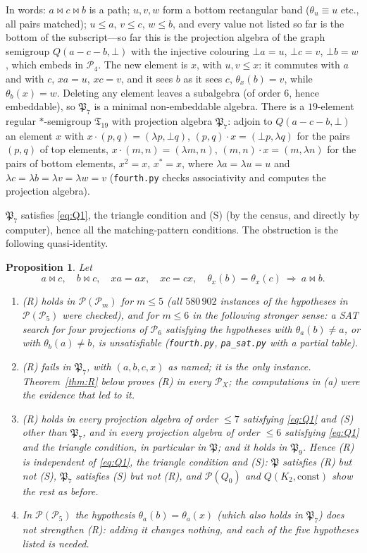 \documentclass[11pt]{amsart}
\newtheorem{proposition}[theorem]{Proposition}
\theoremstyle{definition}
\renewcommand{\P}{\mathcal{P}}
\begin{document}
In words: $a\bowtie c\bowtie b$ is a path; $u,v,w$ form a bottom rectangular band ($\theta_u\equiv u$ etc., all pairs matched); $u\le a$, $v\le c$, $w\le b$, and every value not listed so far is the bottom of the subscript---so far this is the projection algebra of the graph semigroup $Q(a-c-b,\bot)$ with the injective colouring $\bot a=u$, $\bot c=v$, $\bot b=w$, which embeds in $\P_4$. The new element is $x$, with $u,v\le x$: it commutes with $a$ and with $c$, $xa=u$, $xc=v$, and it sees $b$ as it sees $c$, $\theta_x(b)=v$, while $\theta_b(x)=w$. Deleting any element leaves a subalgebra (of order $6$, hence embeddable), so $\mathfrak P_7$ is a minimal non-embeddable algebra. There is a $19$-element regular $*$-semigroup $\mathfrak T_{19}$ with projection algebra $\mathfrak P_7$: adjoin to $Q(a-c-b,\bot)$ an element $x$ with $x\cdot(p,q)=(\lambda p,\bot q)$, $(p,q)\cdot x=(\bot p,\lambda q)$ for the pairs $(p,q)$ of top elements, $x\cdot(m,n)=(\lambda m,n)$, $(m,n)\cdot x=(m,\lambda n)$ for the pairs of bottom elements, $x^2=x$, $x^*=x$, where $\lambda a=\lambda u=u$ and $\lambda c=\lambda b=\lambda v=\lambda w=v$ (\texttt{fourth.py} checks associativity and computes the projection algebra).

$\mathfrak P_7$ satisfies \eqref{eq:Q1}, the triangle condition and (S) (by the census, and directly by computer), hence all the matching-pattern conditions. The obstruction is the following quasi-identity.

\begin{proposition}\label{prop:R}
Let
\[
a\bowtie c,\quad b\bowtie c,\quad xa=ax,\quad xc=cx,\quad \theta_x(b)=\theta_x(c)\ \Longrightarrow\ a\bowtie b .
\tag{R}
\]
\begin{enumerate}[label=\textup{(\alph*)},nosep]
\item (R) holds in $\P(\P_m)$ for $m\le5$ (all $580\,902$ instances of the hypotheses in $\P(\P_5)$ were checked), and for $m\le6$ in the following stronger sense: a SAT search for four projections of $\P_6$ satisfying the hypotheses with $\theta_a(b)\ne a$, or with $\theta_b(a)\ne b$, is unsatisfiable (\texttt{fourth.py}, \texttt{pa\_sat.py} with a partial table).
\item (R) fails in $\mathfrak P_7$, with $(a,b,c,x)$ as named; it is the only instance. Theorem~\ref{thm:R} below proves (R) in every $\P_X$; the computations in (a) were the evidence that led to it.
\item (R) holds in every projection algebra of order $\le7$ satisfying \eqref{eq:Q1} and (S) other than $\mathfrak P_7$, and in every projection algebra of order $\le6$ satisfying \eqref{eq:Q1} and the triangle condition, in particular in $\mathfrak P$; and it holds in $\mathfrak P_9$. Hence (R) is independent of \eqref{eq:Q1}, the triangle condition and (S): $\mathfrak P$ satisfies (R) but not (S), $\mathfrak P_7$ satisfies (S) but not (R), and $\P(Q_0)$ and $Q(K_2,\text{const})$ show the rest as before.
\item In $\P(\P_5)$ the hypothesis $\theta_a(b)=\theta_a(x)$ (which also holds in $\mathfrak P_7$) does not strengthen (R): adding it changes nothing, and each of the five hypotheses listed is needed.
\end{enumerate}
\end{proposition}
\end{document}
